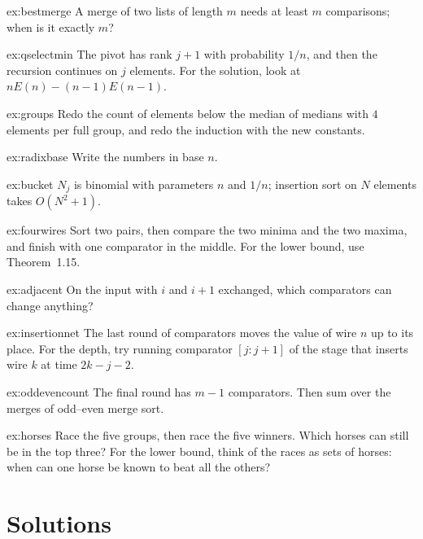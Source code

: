 \begin{hint}{ex:bestmerge}
A merge of two lists of length $m$ needs at least $m$ comparisons; when is it exactly $m$?
\end{hint}
\begin{hint}{ex:qselectmin}
The pivot has rank $j+1$ with probability $1/n$, and then the recursion continues on $j$ elements. For the solution, look at $nE(n)-(n-1)E(n-1)$.
\end{hint}
\begin{hint}{ex:groups}
Redo the count of elements below the median of medians with $4$ elements per full group, and redo the induction with the new constants.
\end{hint}
\begin{hint}{ex:radixbase}
Write the numbers in base $n$.
\end{hint}
\begin{hint}{ex:bucket}
$N_j$ is binomial with parameters $n$ and $1/n$; insertion sort on $N$ elements takes $O(N^2+1)$.
\end{hint}
\begin{hint}{ex:fourwires}
Sort two pairs, then compare the two minima and the two maxima, and finish with one comparator in the middle. For the lower bound, use Theorem~1.15.
\end{hint}
\begin{hint}{ex:adjacent}
On the input with $i$ and $i+1$ exchanged, which comparators can change anything?
\end{hint}
\begin{hint}{ex:insertionnet}
The last round of comparators moves the value of wire $n$ up to its place. For the depth, try running comparator $[j:j+1]$ of the stage that inserts wire $k$ at time $2k-j-2$.
\end{hint}
\begin{hint}{ex:oddevencount}
The final round has $m-1$ comparators. Then sum over the merges of odd--even merge sort.
\end{hint}
\begin{hint}{ex:horses}
Race the five groups, then race the five winners. Which horses can still be in the top three? For the lower bound, think of the races as sets of horses: when can one horse be known to beat
all the others?
\end{hint}

\section{Solutions}

